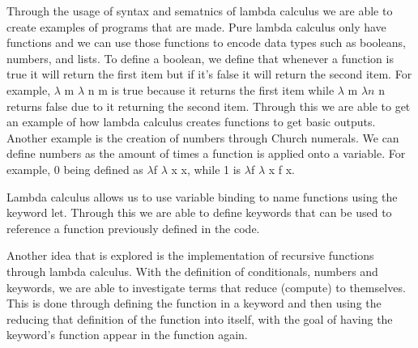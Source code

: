 \documentclass{article}
\theoremstyle{theorem}
\theoremstyle{definition}
\theoremstyle{remark}
\begin{document}
Through the usage of syntax and sematnics of lambda calculus we are able to create examples of programs that are made. Pure lambda calculus only have functions and we can use those functions to encode data types such as booleans, numbers, and lists. To define a boolean, we define that whenever a function is true it will return the first item but if it's false it will return the second item. For example, $\lambda$ m $\lambda$ n m is true because it returns the first item while $\lambda$ m $\lambda n$ n returns false due to it returning the second item. Through this we are able to get an example of how lambda calculus creates functions to get basic outputs. 
Another example is the creation of numbers through Church numerals. We can define numbers as the amount of times a function is applied onto a variable. For example, 0 being defined as $\lambda$f $\lambda$ x x, while 1 is  $\lambda$f $\lambda$ x f x. 

Lambda calculus allows us to use variable binding to name functions using the keyword let. Through this we are able to define keywords that can be used to reference a function previously defined in the code.

Another idea that is explored is the implementation of recursive functions through lambda calculus. With the definition of conditionals, numbers and keywords, we are able to investigate terms that reduce (compute) to themselves. This is done through defining the function in a keyword and then using the reducing that definition of the function into itself, with the goal of having the keyword's function appear in the function again.
\end{document}
